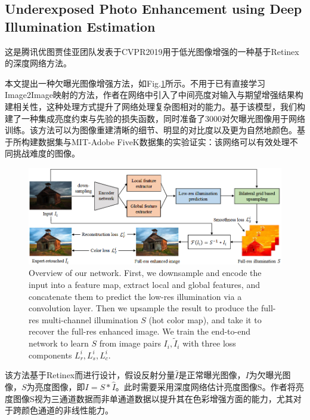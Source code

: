 \documentclass[letterpaper,12pt]{article}
\begin{document}
	\subsection{Underexposed Photo Enhancement using Deep Illumination Estimation}
	
	这是腾讯优图贾佳亚团队发表于CVPR2019用于低光图像增强的一种基于Retinex的深度网络方法。
	
	本文提出一种欠曝光图像增强方法，如Fig.\ref{fig:network overview}所示。不用于已有直接学习Image2Image映射的方法，作者在网络中引入了中间亮度对输入与期望增强结果构建相关性，这种处理方式提升了网络处理复杂图相对的能力。基于该模型，我们构建了一种集成亮度约束与先验的损失函数，同时准备了3000对欠曝光图像用于网络训练。该方法可以为图像重建清晰的细节、明显的对比度以及更为自然地颜色。基于所构建数据集与MIT-Adobe FiveK数据集的实验证实：该网络可以有效处理不同挑战难度的图像。
	
	\begin{figure}[ht] 
		\centering
		\includegraphics[width=0.8\columnwidth]{network_overview}
		\captionsetup{font=scriptsize}
		\caption{
			\label{fig:network overview} %
			Overview of our network. First, we downsample and encode the input into a feature map, extract local and global features, and concatenate them to predict the low-res illumination via a convolution layer. Then we upsample the result to produce the full-res multi-channel illumination $S$ (hot color map), and take it to recover the full-res enhanced image. We train the end-to-end network to learn $S$ from image pairs {$I_i,\tilde{I}_i$} with three loss components {$L_{r}^i,L_{s}^i ,L_{c}^i$}.}
	\end{figure}
	
	该方法基于Retinex而进行设计，假设反射分量$\hat{I}$是正常曝光图像，$I$为欠曝光图像，$S$为亮度图像，即$I=S\ast\hat{I}$。此时需要采用深度网络估计亮度图像S。作者将亮度图像S视为三通道数据而非单通道数据以提升其在色彩增强方面的能力，尤其对于跨颜色通道的非线性能力。
	
\end{document}

